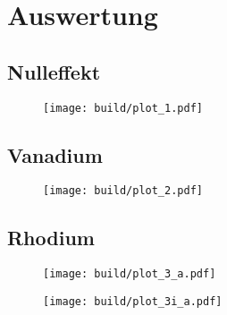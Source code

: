 \newpage
\section{Auswertung}
\label{sec:auswertung}

\subsection{Nulleffekt}

\begin{table}[H]
	\centering
	\caption{}
	\makebox[\linewidth][c]{}
	\label{tab:1}
\end{table}

\begin{figure}[H]
	\centering
	\texttt{[image: build/plot\_1.pdf]}
	\caption{}
	\label{fig:1}
\end{figure}

\subsection{Vanadium}

\begin{table}[H]
	\centering
	\caption{}
	\makebox[\linewidth][c]{}
	\label{tab:2}
\end{table}

\begin{figure}[H]
	\centering
	\texttt{[image: build/plot\_2.pdf]}
	\caption{}
	\label{fig:2}
\end{figure}

\subsection{Rhodium}

\begin{table}[H]
	\centering
	\caption{}
	\makebox[\linewidth][c]{}
	\label{tab:3_a}
\end{table}

\begin{figure}[H]
	\centering
	\texttt{[image: build/plot\_3\_a.pdf]}
	\caption{}
	\label{fig:3_a}
\end{figure}

\begin{figure}[H]
	\centering
	\texttt{[image: build/plot\_3i\_a.pdf]}
	\caption{}
	\label{fig:3i_a}
\end{figure}

